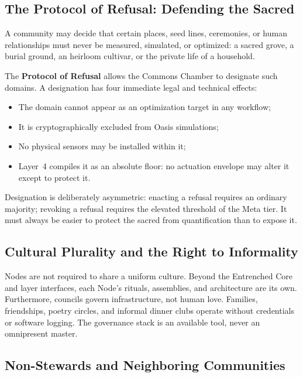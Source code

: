 \subsection{The Protocol of Refusal: Defending the Sacred}
\label{sec:l5-refusal}

A community may decide that certain places, seed lines, ceremonies, or human relationships must never be measured, simulated, or optimized: a sacred grove, a burial ground, an heirloom cultivar, or the private life of a household.

The \textbf{Protocol of Refusal} allows the Commons Chamber to designate such domains. A designation has four immediate legal and technical effects:
\begin{itemize}
  \item The domain cannot appear as an optimization target in any workflow;
  \item It is cryptographically excluded from Oasis simulations;
  \item No physical sensors may be installed within it;
  \item Layer~4 compiles it as an absolute floor: no actuation envelope may alter it except to protect it.
\end{itemize}
Designation is deliberately asymmetric: enacting a refusal requires an ordinary majority; revoking a refusal requires the elevated threshold of the Meta tier. It must always be easier to protect the sacred from quantification than to expose it.

\subsection{Cultural Plurality and the Right to Informality}

Nodes are not required to share a uniform culture. Beyond the Entrenched Core and layer interfaces, each Node's rituals, assemblies, and architecture are its own. Furthermore, councils govern infrastructure, not human love. Families, friendships, poetry circles, and informal dinner clubs operate without credentials or software logging. The governance stack is an available tool, never an omnipresent master.

\subsection{Non-Stewards and Neighboring Communities}
\label{sec:l5-neighbours}

